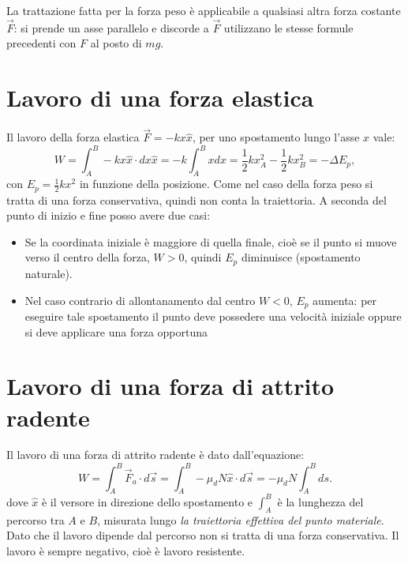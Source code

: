 \documentclass[class=book, crop=false, oneside, 12pt]{standalone}
\begin{document}
La trattazione fatta per la forza peso è applicabile a qualsiasi altra forza costante \(\overrightarrow{F}\): si prende un asse parallelo e discorde a \(\overrightarrow{F}\) utilizzano le stesse formule precedenti con \(F\) al posto di \(mg\).

\section{Lavoro di una forza elastica}

Il lavoro della forza elastica \(\overrightarrow{F} =-k x \hat{x}\), per uno spostamento lungo l'asse \(x\) vale:
\begin{equation}
    W = \int_A^B -k x\hat{x} \cdot dx \hat{x} = -k \int_A^B x dx = \frac{1}{2} k x^2_A - \frac{1}{2} k x^2_B = - \Delta E_p,
\end{equation}
con \(E_p = \frac{1}{2} k x^2\) in funzione della posizione.\newline
Come nel caso della forza peso si tratta di una forza conservativa, quindi non conta la traiettoria.
A seconda del punto di inizio e fine posso avere due casi:
\begin{itemize}
    \item Se la coordinata iniziale è maggiore di quella finale, cioè se il punto si muove verso il centro della forza, \(W>0\), quindi \(E_p\) diminuisce (spostamento naturale).
    \item Nel caso contrario di allontanamento dal centro \(W < 0\), \(E_p\) aumenta: per eseguire tale spostamento il punto deve possedere una velocità iniziale oppure si deve applicare una forza opportuna
\end{itemize}

\section{Lavoro di una forza di attrito radente}

Il lavoro di una forza di attrito radente è dato dall'equazione:
\begin{equation}
    W = \int_A^B \overrightarrow{F}_a \cdot d \overrightarrow{s} = \int_A^B -\mu_d N \hat{x} \cdot d \overrightarrow{s} = - \mu_d N \int_A^B ds .
\end{equation}
dove \(\hat{x}\) è il versore in direzione dello spostamento e \(\int_A^B\) è la lunghezza del percorso tra \(A\) e \(B\), misurata lungo \emph{la traiettoria effettiva del punto materiale}.\newline
Dato che il lavoro dipende dal percorso non si tratta di una forza conservativa.\newline
Il lavoro è sempre negativo, cioè è lavoro resistente.
\end{document}
